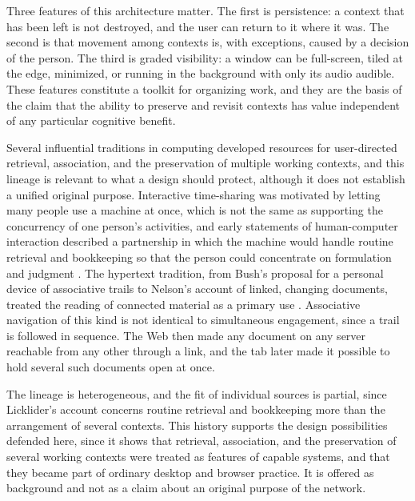 \documentclass[12pt]{article}
\begin{document}
Three features of this architecture matter. The first is persistence: a context that has been left is not destroyed, and the user can return to it where it was. The second is that movement among contexts is, with exceptions, caused by a decision of the person. The third is graded visibility: a window can be full-screen, tiled at the edge, minimized, or running in the background with only its audio audible. These features constitute a toolkit for organizing work, and they are the basis of the claim that the ability to preserve and revisit contexts has value independent of any particular cognitive benefit.

Several influential traditions in computing developed resources for user-directed retrieval, association, and the preservation of multiple working contexts, and this lineage is relevant to what a design should protect, although it does not establish a unified original purpose. Interactive time-sharing was motivated by letting many people use a machine at once, which is not the same as supporting the concurrency of one person's activities, and early statements of human-computer interaction described a partnership in which the machine would handle routine retrieval and bookkeeping so that the person could concentrate on formulation and judgment \cite{licklider1960man}. The hypertext tradition, from Bush's proposal for a personal device of associative trails to Nelson's account of linked, changing documents, treated the reading of connected material as a primary use \cite{bush1945may, nelson1965complex}. Associative navigation of this kind is not identical to simultaneous engagement, since a trail is followed in sequence. The Web then made any document on any server reachable from any other through a link, and the tab later made it possible to hold several such documents open at once.

The lineage is heterogeneous, and the fit of individual sources is partial, since Licklider's account concerns routine retrieval and bookkeeping more than the arrangement of several contexts. This history supports the design possibilities defended here, since it shows that retrieval, association, and the preservation of several working contexts were treated as features of capable systems, and that they became part of ordinary desktop and browser practice. It is offered as background and not as a claim about an original purpose of the network.
\end{document}

